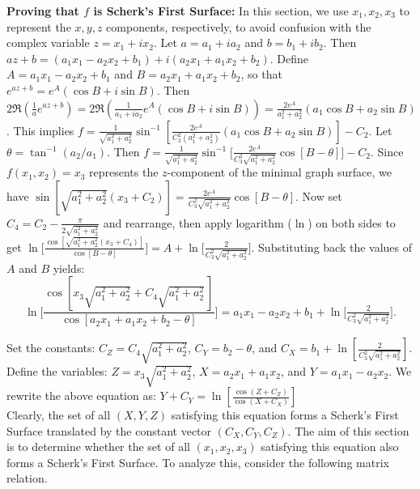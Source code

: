 \documentclass[12pt]{article}
\theoremstyle{plain}
\theoremstyle{definition}
\theoremstyle{remark}
\begin{document}
\textbf{Proving that \(f\) is Scherk’s First Surface:} In this section, we use \(x_1, x_2, x_3\) to represent the \(x, y, z\) components, respectively, to avoid confusion with the complex variable \(z = x_1 + i x_2\). Let \(a = a_1 + i a_2\) and \(b = b_1 + i b_2\). Then \(a z + b = (a_1 x_1 - a_2 x_2 + b_1) + i (a_2 x_1 + a_1 x_2 + b_2)\). Define \(A = a_1 x_1 - a_2 x_2 + b_1\) and \(B = a_2 x_1 + a_1 x_2 + b_2\), so that \(e^{a z + b} = e^{A} (\cos B + i \sin B)\). Then \(2\Re\left(\frac{1}{a} e^{a z + b}\right) = 2\Re\left(\frac{1}{a_1 + i a_2} e^{A} (\cos B + i \sin B)\right) = \frac{2 e^{A}}{a_1^2 + a_2^2} (a_1 \cos B + a_2 \sin B)\). This implies \(f = \frac{1}{\sqrt{a_1^2 + a_2^2}} \sin^{-1}\left[\frac{2 e^{A}}{C_3^2 (a_1^2 + a_2^2)} (a_1 \cos B + a_2 \sin B)\right] - C_2\). Let \(\theta = \tan^{-1}(a_2 / a_1)\). Then \(f = \frac{1}{\sqrt{a_1^2 + a_2^2}} \sin^{-1}\Big[\frac{2 e^{A}}{C_3^2 \sqrt{a_1^2 + a_2^2}} \cos[B - \theta]\Big] - C_2\). Since \(f(x_1, x_2) = x_3\) represents the \(z\)-component of the minimal graph surface, we have \(\sin\left[\sqrt{a_1^2 + a_2^2} (x_3 + C_2)\right] = \frac{2 e^{A}}{C_3^2 \sqrt{a_1^2 + a_2^2}} \cos[B - \theta]\). Now set \(C_4 = C_2 - \frac{\pi}{2\sqrt{a_1^2 + a_2^2}}\) and rearrange, then apply logarithm (\(\ln\)) on both sides to get \(\ln\Big[\frac{\cos\left[\sqrt{a_1^2 + a_2^2} (x_3 + C_4)\right]}{\cos[B - \theta]}\Big] = A + \ln\Big[\frac{2}{C_3^2 \sqrt{a_1^2 + a_2^2}}\Big]\). Substituting back the values of \(A\) and \(B\) yields:
\[
 \boxed{ \ln\Big[\frac{\cos[ x_3\sqrt{a_1^2 + a_2^2} + C_4\sqrt{a_1^2 + a_2^2}\,]}{\cos[a_2 x_1 + a_1 x_2 + b_2 - \theta]}\Big] = a_1 x_1 - a_2 x_2 + b_1 + \ln\Big[\tfrac{2}{C_3^2 \sqrt{a_1^2 + a_2^2}}\Big]}.
\]

Set the constants: \(C_Z = C_4 \sqrt{a_1^2 + a_2^2}\), \(C_Y = b_2 - \theta\), and \(C_X = b_1 + \ln\left[\frac{2}{C_3^2 \sqrt{a_1^2 + a_2^2}}\right]\). Define the variables: \(Z = x_3 \sqrt{a_1^2 + a_2^2}\), \(X = a_2 x_1 + a_1 x_2\), and \(Y = a_1 x_1 - a_2 x_2\). We rewrite the above equation as: \(\boxed{Y + C_Y = \ln\left[\frac{\cos(Z + C_Z)}{\cos(X + C_X)}\right]}\)\\

Clearly, the set of all \((X, Y, Z)\) satisfying this equation forms a Scherk’s First Surface translated by the constant vector \((C_X, C_Y, C_Z)\). The aim of this section is to determine whether the set of all \((x_1, x_2, x_3)\) satisfying this equation also forms a Scherk’s First Surface. To analyze this, consider the following matrix relation.
\end{document}
